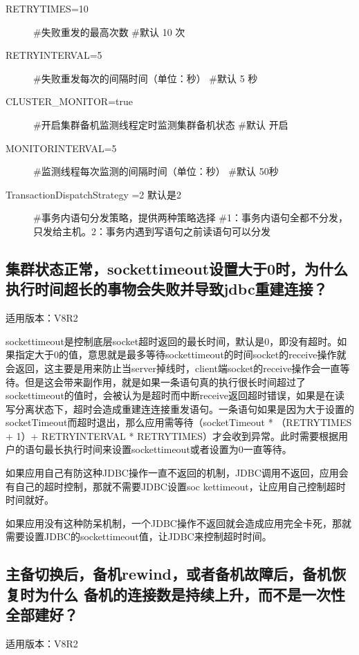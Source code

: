 \documentclass[letterpaper,10pt,english]{sphinxmanual}
\begin{document}
\begin{description}
\item[{RETRYTIMES=10}] \leavevmode
\#失败重发的最高次数
\#默认 10 次

\item[{RETRYINTERVAL=5}] \leavevmode
\#失败重发每次的间隔时间（单位：秒）
\#默认 5 秒

\item[{CLUSTER\_MONITOR=true}] \leavevmode
\#开启集群备机监测线程定时监测集群备机状态
\#默认 开启

\item[{MONITORINTERVAL=5}] \leavevmode
\#监测线程每次监测的间隔时间（单位：秒）
\#默认 50秒

\item[{TransactionDispatchStrategy =2  默认是2}] \leavevmode
\#事务内语句分发策略，提供两种策略选择
\#1：事务内语句全都不分发，只发给主机。2：事务内遇到写语句之前读语句可以分发

\end{description}


\subsection{集群状态正常，sockettimeout设置大于0时，为什么执行时间超长的事物会失败并导致jdbc重建连接？}
\label{\detokenize{interface/jdbc:sockettimeout0-jdbc}}
适用版本：V8R2

sockettimeout是控制底层socket超时返回的最长时间，默认是0，即没有超时。如果指定大于0的值，意思就是最多等待sockettimeout的时间socket的receive操作就会返回，这主要是用来防止当server掉线时，client端socket的receive操作会一直等待。但是这会带来副作用，就是如果一条语句真的执行很长时间超过了sockettimeout的值时，会被认为是超时而中断receive返回超时错误，如果是在读写分离状态下，超时会造成重建连连接重发语句。一条语句如果是因为大于设置的socketTimeout而超时退出，那么应用需等待（socketTimeout * （RETRYTIMES + 1）+ RETRYINTERVAL * RETRYTIMES）才会收到异常。此时需要根据用户的语句最长执行时间来设置sockettimeout或者设置为0一直等待。

如果应用自己有防这种JDBC操作一直不返回的机制，JDBC调用不返回，应用会有自己的超时控制，那就不需要JDBC设置soc kettimeout，让应用自己控制超时时间就好。

如果应用没有这种防呆机制，一个JDBC操作不返回就会造成应用完全卡死，那就需要设置JDBC的sockettimeout值，让JDBC来控制超时时间。


\subsection{主备切换后，备机rewind，或者备机故障后，备机恢复时为什么 备机的连接数是持续上升，而不是一次性全部建好？}
\label{\detokenize{interface/jdbc:rewind}}
适用版本：V8R2
\end{document}
